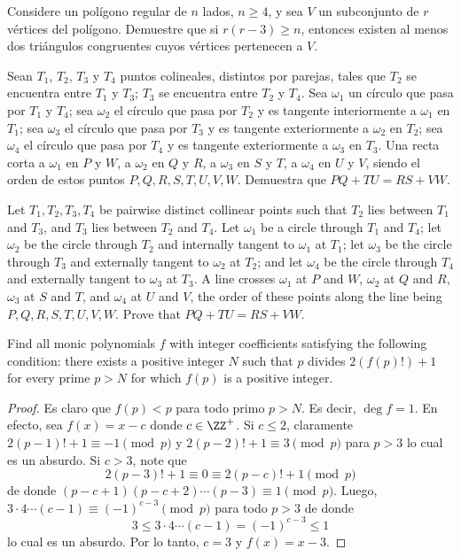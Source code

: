 \begin{problem}[IberoAmerican 2021/6]
	Considere un polígono regular de $n$ lados, $n\ge 4$, y sea $V$ un subconjunto de $r$ vértices del polígono. Demuestre que si $r(r-3)\ge n$, entonces existen al menos dos triángulos congruentes cuyos vértices pertenecen a $V$.
\end{problem}

\begin{problem}[RMM 2021/1]
	Sean $T_1$, $T_2$, $T_3$ y $T_4$ puntos colineales, distintos por parejas, tales que $T_2$ se encuentra entre $T_1$ y $T_3$; $T_3$ se encuentra entre $T_2$ y $T_4$. Sea $\omega_1$ un círculo que pasa por $T_1$ y $T_4$; sea $\omega_2$ el círculo que pasa por $T_2$ y es tangente interiormente a $\omega_1$ en $T_1$; sea $\omega_3$ el círculo que pasa por $T_3$ y es tangente exteriormente a $\omega_2$ en $T_2$; sea $\omega_4$ el círculo que pasa por $T_4$ y es tangente exteriormente a $\omega_3$ en $T_3$. Una recta corta a $\omega_1$ en $P$ y $W$, a $\omega_2$ en $Q$ y $R$, a $\omega_3$ en $S$ y $T$, a $\omega_4$ en $U$ y $V$, siendo el orden de estos puntos $P,Q,R,S,T,U,V,W$. Demuestra que $PQ+TU=RS+VW$.
	\begin{hint}
		Let $T_1,T_2,T_3,T_4$ be pairwise distinct collinear points such that $T_2$ lies between $T_1$ and $T_3$, and $T_3$ lies between $T_2$ and $T_4$. Let $\omega_1$ be a circle through $T_1$ and $T_4$; let $\omega_2$ be the circle through $T_2$ and internally tangent to $\omega_1$ at $T_1$; let $\omega_3$ be the circle through $T_3$ and externally tangent to $\omega_2$ at $T_2$; and let $\omega_4$ be the circle through $T_4$ and externally tangent to $\omega_3$ at $T_3$. A line crosses $\omega_1$ at $P$ and $W$, $\omega_2$ at $Q$ and $R$, $\omega_3$ at $S$ and $T$, and $\omega_4$ at $U$ and $V$, the order of these points along the line being $P,Q,R,S,T,U,V,W$. Prove that $PQ+TU=RS+VW$.
	\end{hint}
\end{problem}

\begin{probEG}[Balkan MO 2016/3]
	Find all monic polynomials $f$ with integer coefficients satisfying the following condition: there exists a positive integer $N$ such that $p$ divides $2(f(p)!)+1$ for every prime $p>N$ for which $f(p)$ is a positive integer.
\end{probEG}

\begin{proof}
	Es claro que $f(p)<p$ para todo primo $p>N$. Es decir, $\deg f=1$. En efecto, sea $f(x)=x-c$ donde $c\in\ZZ^+$. Si $c\le 2$, claramente $2(p-1)!+1\equiv -1\pmod p$ y $2(p-2)!+1\equiv 3\pmod p$ para $p>3$ lo cual es un absurdo. Si $c>3$, note que
	\[2(p-3)!+1\equiv 0\equiv 2(p-c)!+1\pmod p\]
	de donde $(p-c+1)(p-c+2)\cdots(p-3)\equiv 1\pmod p$. Luego, $3\cdot 4\cdots(c-1)\equiv(-1)^{c-3}\pmod p$ para todo $p>3$ de donde
	\[3\le 3\cdot 4\cdots(c-1)=(-1)^{c-3}\le 1\]
	lo cual es un absurdo. Por lo tanto, $c=3$ y $f(x)=x-3$.
\end{proof}

